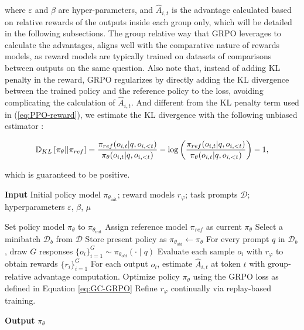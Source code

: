 \begin{itemize}[topsep=0pt]
\begin{itemize}[topsep=0pt]
where $\varepsilon$ and $\beta$ are hyper-parameters, and $\hat{A}_{i,t}$  is the advantage calculated based on relative rewards of the outputs inside each group only, which will be detailed in the following subsections. The group relative way that GRPO leverages to calculate the advantages, aligns well with the comparative nature of rewards models,  as reward models are typically trained on datasets of comparisons between outputs on the same question. Also note that, instead of adding KL penalty in the reward, GRPO regularizes by directly adding the KL divergence between the trained policy and the reference policy to the loss, avoiding complicating the calculation of  $\hat{A}_{i,t}$. And different from the KL penalty term used in (\ref{eq:PPO-reward}), we estimate the KL divergence with the following unbiased estimator \citep{kl_approx}:

\begin{equation}
\small
    \mathbb{D}_{KL}\left[\pi_{\theta} || \pi_{ref}\right] = \frac{\pi_{ref}(o_{i,t}|q,o_{i,<t})}{\pi_{\theta}(o_{i,t}|q,o_{i,<t})} - \log\left(\frac{\pi_{ref}(o_{i,t}|q,o_{i,<t})}{\pi_{\theta}(o_{i,t}|q,o_{i,<t})}\right) - 1,
\end{equation}

which is guaranteed to be positive.

\begin{algorithm}[t]
  \small
  \caption{Iterative Group Relative Policy Optimization}
  \textbf{Input} Initial policy model $\pi_{\theta_{\text{init}}}$; reward models $r_\varphi$; task prompts $\mathcal{D}$; 
  hyperparameters $\varepsilon$, $\beta$, $\mu$
  \begin{algorithmic}[1]
    \State Set policy model $\pi_\theta$ to $\pi_{\theta_{\text{init}}}$
      \State Assign reference model $\pi_{ref}$ as current $\pi_{\theta}$
        \State Select a minibatch $\mathcal{D}_b$ from $\mathcal{D}$
        \State Store present policy as $\pi_{\theta_{old}} \leftarrow \pi_{\theta}$
        \State For every prompt $q$ in $\mathcal{D}_b$, draw $G$ responses $\{o_i\}_{i=1}^G \sim \pi_{\theta_{old}}(\cdot \mid q)$
        \State Evaluate each sample $o_i$ with $r_{\varphi}$ to obtain rewards $\{r_i\}_{i=1}^G$
        \State For each output $o_i$, estimate $\hat{A}_{i,t}$ at token $t$ with group-relative advantage computation.
          \State Optimize policy $\pi_\theta$ using the GRPO loss as defined in Equation \ref{eq:GC-GRPO}
        \EndFor
      \EndFor
      \State Refine $r_\varphi$ continually via replay-based training.
    \EndFor
  \end{algorithmic}
  \textbf{Output} $\pi_\theta$
  \label{alg:iter-grpo}
\end{algorithm}


\end{itemize}
\end{itemize}
